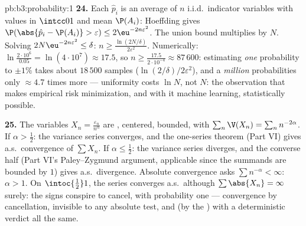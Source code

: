 \begin{solution}{pb:b3:probability:1}
\textbf{24.} Each $\hat p_i$ is an average of $n$ i.i.d.\
indicator variables with values in $\intcc01$ and mean
$\P(A_i)$: Hoeffding gives $\P(\abs{\hat p_i - \P(A_i)} >
\varepsilon) \leq 2\eu^{-2n\varepsilon^2}$. The union bound
multiplies by $N$. Solving $2N\eu^{-2n\varepsilon^2} \leq
\delta$: $n \geq \frac{\ln(2N/\delta)}{2\varepsilon^2}$.
Numerically: $\ln\frac{2\cdot10^6}{0.05} =
\ln(4\cdot10^7) \approx 17.5$, so $n \geq
\frac{17.5}{2\cdot10^{-4}} \approx 87\,600$: estimating
\emph{one} probability to $\pm1\%$ takes about $18\,500$
samples ($\ln(2/\delta)/2\varepsilon^2$), and a
\emph{million} probabilities only $\approx 4.7$ times more
--- uniformity costs $\ln N$, not $N$: the observation that
makes empirical risk minimization, and with it machine
learning, statistically possible.

\textbf{25.} The variables $X_n = \frac{\varepsilon_n}
{n^\alpha}$ are , centered, bounded, with
$\sum_n\V(X_n) = \sum_nn^{-2\alpha}$. If $\alpha >
\frac12$: the variance series converges, and the
one-series theorem (Part VI) gives a.s.\ convergence of
$\sum X_n$. If $\alpha \leq \frac12$: the variance series
diverges, and the converse half (Part VI's
Paley--Zygmund argument, applicable since the summands are
bounded by $1$) gives a.s.\ divergence. Absolute
convergence asks $\sum n^{-\alpha} < \infty$: $\alpha > 1$.
On $\intoc{\frac12}1$, the series converges a.s.\ although
$\sum\abs{X_n} = \infty$ surely: the signs conspire to
cancel, with probability one --- convergence by
cancellation, invisible to any absolute test, and (by the
) with a deterministic verdict all the same.
\end{solution}

